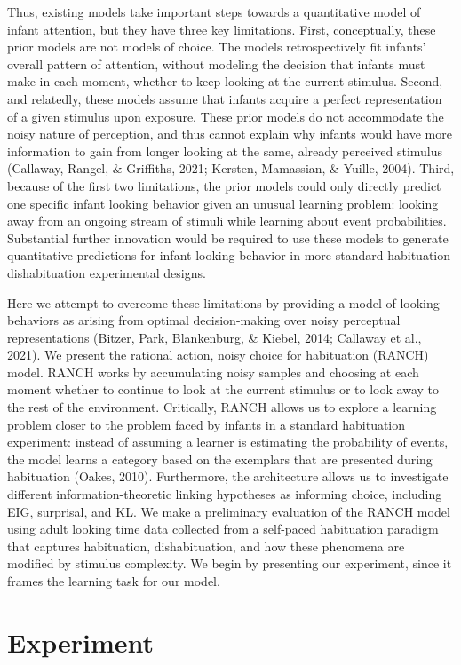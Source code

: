 \documentclass[10pt, letterpaper]{article}
\begin{document}
Thus, existing models take important steps towards a quantitative model
of infant attention, but they have three key limitations. First,
conceptually, these prior models are not models of choice. The models
retrospectively fit infants' overall pattern of attention, without
modeling the decision that infants must make in each moment, whether to
keep looking at the current stimulus. Second, and relatedly, these
models assume that infants acquire a perfect representation of a given
stimulus upon exposure. These prior models do not accommodate the noisy
nature of perception, and thus cannot explain why infants would have
more information to gain from longer looking at the same, already
perceived stimulus (Callaway, Rangel, \& Griffiths, 2021; Kersten,
Mamassian, \& Yuille, 2004). Third, because of the first two
limitations, the prior models could only directly predict one specific
infant looking behavior given an unusual learning problem: looking away
from an ongoing stream of stimuli while learning about event
probabilities. Substantial further innovation would be required to use
these models to generate quantitative predictions for infant looking
behavior in more standard habituation-dishabituation experimental
designs.

Here we attempt to overcome these limitations by providing a model of
looking behaviors as arising from optimal decision-making over noisy
perceptual representations (Bitzer, Park, Blankenburg, \& Kiebel, 2014;
Callaway et al., 2021). We present the rational action, noisy choice for
habituation (RANCH) model. RANCH works by accumulating noisy samples and
choosing at each moment whether to continue to look at the current
stimulus or to look away to the rest of the environment. Critically,
RANCH allows us to explore a learning problem closer to the problem
faced by infants in a standard habituation experiment: instead of
assuming a learner is estimating the probability of events, the model
learns a category based on the exemplars that are presented during
habituation (Oakes, 2010). Furthermore, the architecture allows us to
investigate different information-theoretic linking hypotheses as
informing choice, including EIG, surprisal, and KL. We make a
preliminary evaluation of the RANCH model using adult looking time data
collected from a self-paced habituation paradigm that captures
habituation, dishabituation, and how these phenomena are modified by
stimulus complexity. We begin by presenting our experiment, since it
frames the learning task for our model.

\hypertarget{experiment}{%
\section{Experiment}\label{experiment}}
\end{document}

